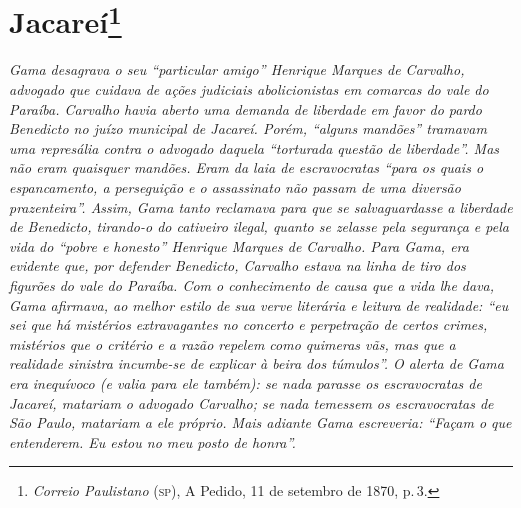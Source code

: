 \chapter{Jacareí\footnote{\emph{Correio Paulistano} (\textsc{sp}), A Pedido, 11 de setembro de 1870,
  p.\,3.}} %

\begin{didascalia}
\emph{Gama desagrava o seu ``particular amigo'' Henrique Marques de
Carvalho, advogado que cuidava de ações judiciais abolicionistas em
comarcas do vale do Paraíba. Carvalho havia aberto uma demanda de
liberdade em favor do pardo Benedicto no juízo municipal de Jacareí.
Porém, ``alguns mandões'' tramavam uma represália contra o advogado
daquela ``torturada questão de liberdade''. Mas não eram quaisquer
mandões. Eram da laia de escravocratas ``para os quais o espancamento, a
perseguição e o assassinato não passam de uma diversão prazenteira''.
Assim, Gama tanto reclamava para que se salvaguardasse a liberdade de
Benedicto, tirando-o do cativeiro ilegal, quanto se zelasse pela
segurança e pela vida do ``pobre e honesto'' Henrique Marques de Carvalho.
Para Gama, era evidente que, por defender Benedicto, Carvalho estava na
linha de tiro dos figurões do vale do Paraíba. Com o conhecimento de
causa que a vida lhe dava, Gama afirmava, ao melhor estilo de sua verve
literária e leitura de realidade: ``eu sei que há mistérios extravagantes
no concerto e perpetração de certos crimes, mistérios que o critério e a
razão repelem como quimeras vãs, mas que a realidade sinistra incumbe-se
de explicar à beira dos túmulos''. O alerta de Gama era inequívoco (e
valia para ele também): se nada parasse os escravocratas de Jacareí,
matariam o advogado Carvalho; se nada temessem os escravocratas de São
Paulo, matariam a ele próprio. Mais adiante Gama escreveria: ``Façam o
que entenderem. Eu estou no meu posto de honra''.}
\end{didascalia}


